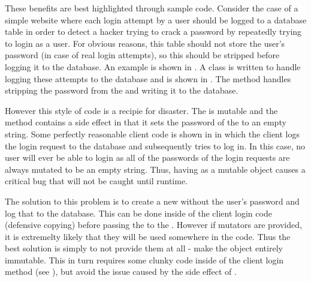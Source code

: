These benefits are best highlighted through sample code. Consider the case of a simple website where each login attempt by a user should be logged to a database table in order to detect a hacker trying to crack a password by repeatedly trying to login as a user. For obvious reasons, this table should not store the user's password (in case of real login attempts), so this should be stripped before logging it to the database. An example  is shown in . A  class is written to handle logging these attempts to the database and is shown in . The  method handles stripping the password from the  and writing it to the database. 





However this style of code is a recipie for disaster. The  is mutable and the  method contains a side effect in that it sets the password of the  to an empty string. Some perfectly reasonable client code is shown in  in which the client logs the login request to the database and subsequently tries to log in. In this case, no user will ever be able to login as all of the passwords of the login requests are always mutated to be an empty string. Thus, having  as a mutable object causes a critical bug that will not be caught until runtime.



The solution to this problem is to create a new  without the user's password and log that to the database. This can be done inside of the client login code (defensive copying) before passing the  to the . However if mutators are provided, it is extremelty likely that they will be used somewhere in the code. Thus the best solution is simply to not provide them at all - make the object entirely immutable. This in turn requires some clunky code inside of the client login method (see ), but avoid the issue caused by the side effect of . 

